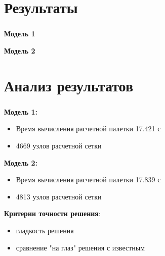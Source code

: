 
\section{Результаты}

\begin{frame}
\frametitle{\insertsection}

\vspace{-0.5cm}
\begin{minipage}[t]{0.47\linewidth}
    \textbf{Модель 1}
\end{minipage}
\hfill
\begin{minipage}[t]{0.47\linewidth}
    \textbf{Модель 2}
\end{minipage}

\end{frame}


\section{Анализ результатов}

\begin{frame}
\frametitle{\insertsection}

\textbf{Модель 1:}
\begin{itemize}
    \item Время вычисления расчетной палетки 17.421 с
    \item 4669 узлов расчетной сетки
\end{itemize}
\bigskip

\textbf{Модель 2:}
\begin{itemize}
    \item Время вычисления расчетной палетки 17.839 с
    \item 4813 узлов расчетной сетки
\end{itemize}
\bigskip

\textbf{Критерии точности решения}:
\begin{itemize}
    \item гладкость решения
    \item сравнение "на глаз" решения с известным
\end{itemize}
\end{frame}

